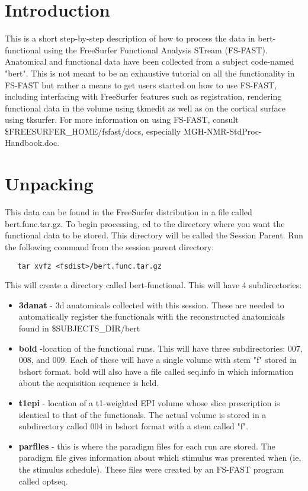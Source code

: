 \documentclass[12pt]{article}
\begin{document}
\section{Introduction}

This is a short step-by-step description of how to process the data in
bert-functional using the FreeSurfer Functional Analysis STream
(FS-FAST). Anatomical and functional data have been collected from a
subject code-named "bert". This is not meant to be an exhaustive
tutorial on all the functionality in FS-FAST but rather a means to get
users started on how to use FS-FAST, including interfacing with
FreeSurfer features such as registration, rendering functional data in
the volume using tkmedit as well as on the cortical surface using
tksurfer. For more information on using FS-FAST, consult
\$FREESURFER\_HOME/fsfast/docs, especially
MGH-NMR-StdProc-Handbook.doc.\\

\section{Unpacking}

This data can be found in the FreeSurfer distribution in a file called
bert.func.tar.gz. To begin processing, cd to the directory where you
want the functional data to be stored. This directory will be called
the Session Parent. Run the following command from the session parent
directory:
\begin{verbatim}
   tar xvfz <fsdist>/bert.func.tar.gz
\end{verbatim}
This will create a directory called bert-functional. This will have 4
subdirectories: \\

\begin{itemize}
\item {\bf 3danat} - 3d anatomicals collected with this session. These
are needed to automatically register the functionals with the
reconstructed anatomicals found in \$SUBJECTS\_DIR/bert

\item {\bf bold} -location of the functional runs. This will have three
subdirectories: 007, 008, and 009. Each of these will have a single
volume with stem "f" stored in bshort format. bold will also have a
file called seq.info in which information about the acquisition
sequence is held.

\item {\bf t1epi} - location of a t1-weighted EPI volume whose slice
prescription is identical to that of the functionals. The actual
volume is stored in a subdirectory called 004 in bshort format with a
stem called "f".

\item {\bf parfiles} - this is where the paradigm files for each run
are stored. The paradigm file gives information about which stimulus
was presented when (ie, the stimulus schedule). These files were
created by an FS-FAST program called optseq.
\end{itemize}
\end{document}
